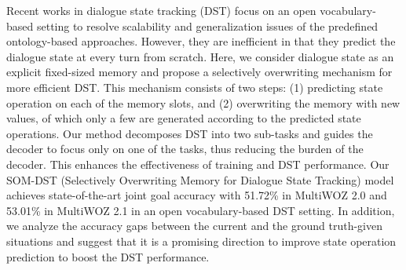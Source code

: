 Recent works in dialogue state tracking (DST) focus on an open vocabulary-based setting to resolve scalability and generalization issues of the predefined ontology-based approaches. However, they are inefficient in that they predict the dialogue state at every turn from scratch. Here, we consider dialogue state as an explicit fixed-sized memory and propose a selectively overwriting mechanism for more efficient DST. This mechanism consists of two steps: (1) predicting state operation on each of the memory slots, and (2) overwriting the memory with new values, of which only a few are generated according to the predicted state operations. Our method decomposes DST into two sub-tasks and guides the decoder to focus only on one of the tasks, thus reducing the burden of the decoder. This enhances the effectiveness of training and DST performance. Our SOM-DST (Selectively Overwriting Memory for Dialogue State Tracking) model achieves state-of-the-art joint goal accuracy with 51.72\% in MultiWOZ 2.0 and 53.01\% in MultiWOZ 2.1 in an open vocabulary-based DST setting. In addition, we analyze the accuracy gaps between the current and the ground truth-given situations and suggest that it is a promising direction to improve state operation prediction to boost the DST performance.
